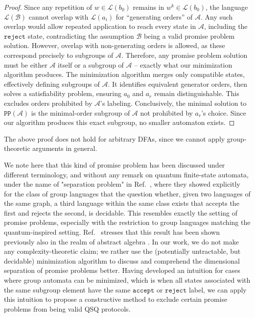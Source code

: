 \documentclass[../main.tex]{subfiles}
\begin{document}
\begin{proof}
    Since any repetition of $w \in \mathcal{L}(b_0)$ remains in $ w^k \in \mathcal{L}(b_0)$, the language $\mathcal{L}(\mathcal{B})$ cannot overlap with $\mathcal{L}(a_i)$ for ``generating orders'' of $\mathcal{A}$. Any such overlap would allow repeated application to reach every state in $\mathcal{A}$, including the $\mathtt{reject}$  state, contradicting the assumption $\mathcal{B}$ being a valid promise problem solution.
    However, overlap with non-generating orders is allowed, as these correspond precisely to subgroups of $\mathcal{A}$. Therefore, any promise problem solution must be either $\mathcal{A}$ itself or a subgroup of $\mathcal{A}$ -- exactly what our minimization algorithm produces.
    The minimization algorithm merges only compatible states, effectively defining subgroups of $\mathcal{A}$. It identifies equivalent generator orders, then solves a satisfiability problem, ensuring $a_0$ and $a_r$ remain distinguishable. This excludes orders prohibited by $\mathcal{A}$'s labeling.
    Conclusively, the minimal solution to $\mathtt{PP}(\mathcal{A})$ is the minimal-order subgroup of $\mathcal{A}$ not prohibited by $a_r$'s choice. Since our algorithm produces this exact subgroup, no smaller automaton exists. 
\end{proof}

The above proof does not hold for arbitrary DFAs, since we cannot apply group-theoretic arguments in general.

We note here that this kind of promise problem has been discussed under different terminology, and without any remark on quantum finite-state automata, under the name of "separation problem" in Ref.~\cite{place2022group}, where they showed explicitly for the class of group languages that the question whether, given two languages of the same graph, a third language within the same class exists that accepts the first and rejects the second, is decidable. This resembles exactly the setting of promise problems, especially with the restriction to group languages matching the quantum-inspired setting. Ref.~\cite{place2022group} stresses that this result has been shown previously also in the realm of abstract algebra \cite{ash1991inevitable}. In our work, we do not make any complexity-theoretic claim; we rather use the (potentially untractable, but decidable) minimization algorithm to discuss and comprehend the dimensional separation of promise problems better. Having developed an intuition for cases where group automata can be minimized, which is when all states associated with the same subgroup element have the same $\mathtt{accept}$ or $\mathtt{reject}$  label, we can apply this intuition to propose a constructive method to exclude certain promise problems from being valid QSQ protocols.
\end{document}

